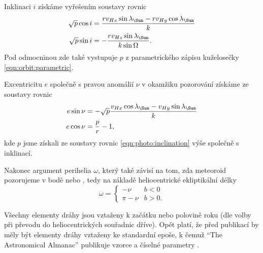 Inklinaci $i$ získáme vyřešením soustavy rovnic \cite{ceplecha}
\begin{equation}
    \begin{aligned}
        \sqrt{p}\cos{i}&=\frac{rv_{Hx}\sin{\lambda_\text{\Sun}}-rv_{Hy}\cos{\lambda_\text{\Sun}}}{k}\\
        \sqrt{p}\sin{i}&=-\frac{rv_{Hz}\sin{\lambda_\text{\Sun}}}{k\sin{\Omega}}\text{.}
    \end{aligned}
    \label{eqn:photo:inclination}
\end{equation}
Pod odmocninou zde také vystupuje $p$ z parametrického zápisu kuželosečky \eqref{eqn:orbit:parametric}.

Excentricitu $e$ společně s pravou anomálií $\nu$ v okamžiku pozorování získáme ze soustavy rovnic \cite{ceplecha}
\begin{equation}
    \begin{aligned}
        e\sin{\nu}&=-\sqrt{p}\frac{v_{Hx}\cos{\lambda_\text{\Sun}}-v_{Hy}\sin{\lambda_\text{\Sun}}}{k}\\
        e\cos{\nu}&=\frac{p}{r}-1\text{,}
    \end{aligned}
\end{equation}
kde $p$ jsme získali ze soustavy rovnic \eqref{eqn:photo:inclination} výše společně s inklinací.

Nakonec argument perihelia $\omega$, který také závisí na tom, zda meteoroid pozorujeme v bodě {\NorthNode} nebo {\SouthNode}, tedy na základě heliocentrické ekliptikální délky \cite{ceplecha}
\begin{equation}
    \omega=\begin{cases}
        -\nu&b<0\\
        \pi-\nu&b>0 \text{.}
    \end{cases}
\end{equation}

\smallskip

Všechny elementy dráhy jsou vztaženy k začátku nebo polovině roku (dle volby při převodu do heliocentrických souřadnic dříve). Opět platí, že před publikací by měly být elementy dráhy vztaženy ke standardní epoše, k čemuž "`The Astronomical Almanac"' publikuje vzorce a číselné parametry \cite{ceplecha}.
